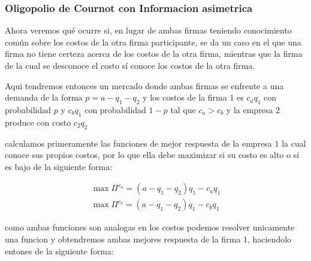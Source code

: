 \documentclass[11pt]{article}
\begin{document}
\begin{flushleft}
\begin{minipage}{0.5\textwidth}
    \end{minipage}

\subsubsection{Oligopolio de Cournot con Informacion asimetrica}

    Ahora veremos qué ocurre si, en lugar de ambas firmas teniendo conocimiento común sobre los costos de la otra firma participante, se da un caso en el que una firma no tiene certeza acerca de los costos de la otra firma, mientras que la firma de la cual se desconoce el costo sí conoce los costos de la otra firma.

    Aqui tendremos entonces un mercado donde ambas firmas se enfrente a una demanda de la forma $p = a-q_1-q_2$ y los costos de la firma $1$ es $c_aq_1$ con probabilidad $p$ y  $c_bq_1$ con probabilidad $1-p$ tal que $c_a>c_b$ y la empresa $2$ produce con costo $c_2q_2$

    calculamos primeramente las funciones de mejor respuesta de la empresa $1$ la cual conoce sus propios costos, por lo que ella debe maximizar si su costo es alto o si es bajo de la siguiente forma:

    \begin{align*}
        \max \Pi^{c_a} = (a-q_1-q_2)q_1-c_aq_1\\
        \max \Pi^{c_b} = (a-q_1-q_2)q_1-c_bq_1
    \end{align*}

    como ambas funciones son analogas en los costos podemos resolver unicamente una funcion y obtendremos ambas mejores respuesta de la firma $1$, haciendolo entones de la siguiente forma:


\end{flushleft}
\end{document}
